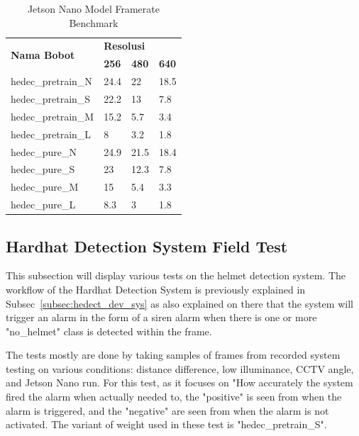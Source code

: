 \begin{table}
  \centering
  \caption{Jetson Nano Model Framerate Benchmark}
  \label{tb:jetsonano_model_benchmark}
  \begin{tabular}{|l|l|l|l|} 
    \hline
    \multirow{2}{*}{\textbf{Nama Bobot}} & \multicolumn{3}{l|}{\textbf{Resolusi}}      \\ 
    \cline{2-4}
                                         & \textbf{256} & \textbf{480} & \textbf{640}  \\ 
    \hline
    hedec\_pretrain\_N                   & 24.4         & 22           & 18.5          \\
    hedec\_pretrain\_S                   & 22.2         & 13           & 7.8           \\
    hedec\_pretrain\_M                   & 15.2         & 5.7          & 3.4           \\
    hedec\_pretrain\_L                   & 8            & 3.2          & 1.8           \\
    hedec\_pure\_N                       & 24.9         & 21.5         & 18.4          \\
    hedec\_pure\_S                       & 23           & 12.3         & 7.8           \\
    hedec\_pure\_M                       & 15           & 5.4          & 3.3           \\
    hedec\_pure\_L                       & 8.3          & 3            & 1.8           \\
    \hline
  \end{tabular}
\end{table}


\subsection{Hardhat Detection System Field Test}
\label{subsec:hedect_sys_test}

\par This subsection will display various tests on the helmet detection system. The workflow of the Hardhat Detection System is previously explained in Subsec~\ref{subsec:hedect_dev_sys} as also explained on there that the system will trigger an alarm in the form of a siren alarm when there is one or more "no\_helmet" class is detected within the frame. 

\par The tests mostly are done by taking samples of frames from recorded system testing on various conditions: distance difference, low illuminance, CCTV angle, and Jetson Nano run. For this test, as it focuses on "How accurately the system fired the alarm when actually needed to, the "positive" is seen from when the alarm is triggered, and the "negative" are seen from when the alarm is not activated. The variant of weight used in these test is "hedec\_pretrain\_S".


